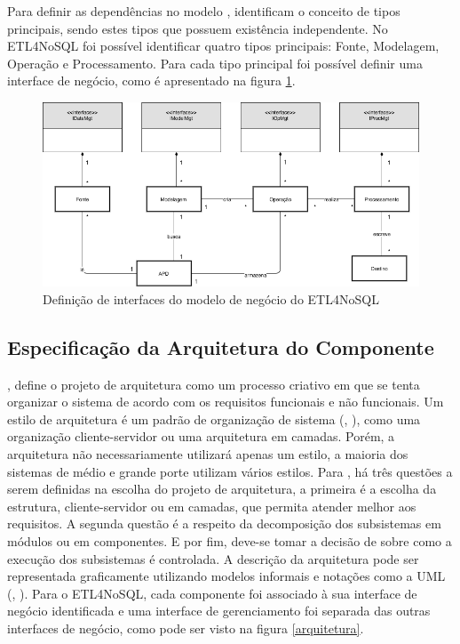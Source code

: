 Para definir as dependências no modelo \cite{cheesman:2001}, identificam o conceito de tipos principais, sendo estes tipos que possuem existência independente.
No ETL4NoSQL foi possível identificar quatro tipos principais: Fonte, Modelagem, Operação e Processamento. Para cada tipo principal foi possível definir uma interface de negócio, como é apresentado na figura \ref{modelo_negocio}.

\begin{figure}[h]
	\centering
	\includegraphics[scale=0.58]{fig/modelo_negocio.png}
	\caption{Definição de interfaces do modelo de negócio do ETL4NoSQL}
	\label{modelo_negocio}
\end{figure}

\subsection{Especificação da Arquitetura do Componente}

\cite{sommerville:2013}, define o projeto de arquitetura como um processo criativo em que se tenta organizar o sistema de acordo com os requisitos funcionais e não funcionais. Um estilo de arquitetura é um padrão de organização de sistema (\cite{shaw:1996}, \cite{sommerville:2013}), como uma organização cliente-servidor ou uma arquitetura em camadas. Porém, a arquitetura não necessariamente utilizará apenas um estilo, a maioria dos sistemas de médio e grande porte utilizam vários estilos. Para \cite{shaw:1996}, há três questões a serem definidas na escolha do projeto de arquitetura, a primeira é a escolha da estrutura, cliente-servidor ou em camadas, que permita atender melhor aos requisitos. A segunda questão é a respeito da decomposição dos subsistemas em módulos ou em componentes. E por fim, deve-se tomar a decisão de sobre como a execução dos subsistemas é controlada. A descrição da arquitetura pode ser representada graficamente utilizando modelos informais e notações como a UML (\cite{clements:2002}, \cite{sommerville:2013}). Para o ETL4NoSQL, cada componente foi associado à sua interface de negócio identificada e uma interface de gerenciamento foi separada das outras interfaces de negócio, como pode ser visto na figura \ref{arquitetura}.

